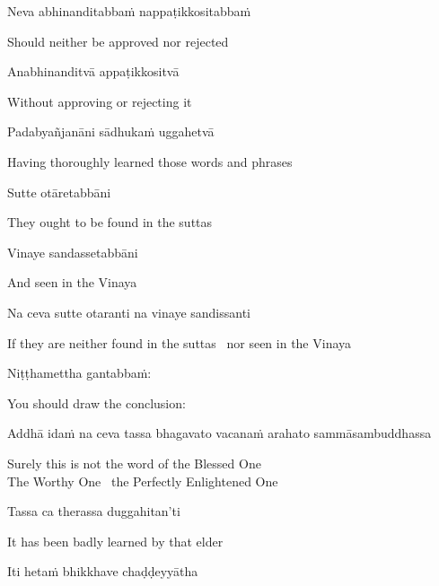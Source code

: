 Neva abhinanditabbaṁ nappaṭikkositabbaṁ

\begin{cprenglish}
  Should neither be approved nor rejected
\end{cprenglish}

Anabhinanditvā appaṭikkositvā

\begin{cprenglish}
  Without approving or rejecting it
\end{cprenglish}

Padabyañjanāni sādhukaṁ uggahetvā

\begin{cprenglish}
  Having thoroughly learned those words and phrases
\end{cprenglish}

Sutte otāretabbāni

\begin{cprenglish}
  They ought to be found in the suttas
\end{cprenglish}

Vinaye sandassetabbāni

\begin{cprenglish}
  And seen in the Vinaya
\end{cprenglish}

Na ceva sutte otaranti na vinaye sandissanti

\begin{cprenglish}
  If they are neither found in the suttas \breathmark\ nor seen in the Vinaya
\end{cprenglish}

Niṭṭhamettha gantabbaṁ:

\begin{cprenglish}
  You should draw the conclusion:
\end{cprenglish}

Addhā idaṁ na ceva tassa bhagavato vacanaṁ arahato sammāsambuddhassa

\begin{cprenglish}
  Surely this is not the word of the Blessed One\\
  The Worthy One \breathmark\ the Perfectly Enlightened One
\end{cprenglish}

Tassa ca therassa duggahitan’ti

\begin{cprenglish}
  It has been badly learned by that elder
\end{cprenglish}

Iti hetaṁ bhikkhave chaḍḍeyyātha

